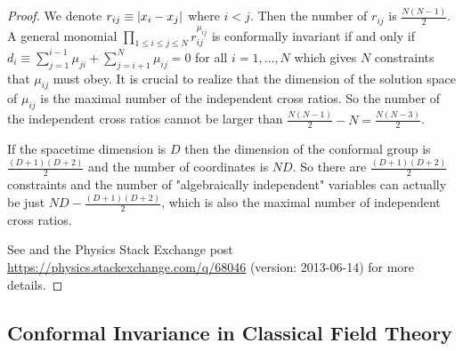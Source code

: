 \documentclass[10pt]{article}
\begin{document}
\begin{proof}
    We denote $r_{ij}\equiv\abs{x_i-x_j}$ where $i<j$.
    Then the number of $r_{ij}$ is $\frac{N(N-1)}{2}$.
    A general monomial $\prod_{1\leq i\leq j\leq N}r^{\mu_{ij}}_{ij}$ is conformally invariant if and only if $d_i\equiv\sum^{i-1}_{j=1}\mu_{ji}+\sum^N_{j=i+1}\mu_{ij}=0$ for all $i=1,\dots,N$ which gives $N$ constraints that $\mu_{ij}$ must obey.
    It is crucial to realize that the dimension of the solution space of $\mu_{ij}$ is the maximal number of the independent cross ratios\snm.
    So the number of the independent cross ratios cannot be larger than $\frac{N(N-1)}{2}-N=\frac{N(N-3)}{2}$.
    
    If the spacetime dimension is $D$ then the dimension of the conformal group is $\frac{(D+1)(D+2)}{2}$ and the number of coordinates is $ND$.
    So there are $\frac{(D+1)(D+2)}{2}$ constraints and the number of "algebraically independent" variables can actually be just $ND-\frac{(D+1)(D+2)}{2}$, which is also the maximal number of independent cross ratios.
    
    See \cite{Ginsparg:1988ui} and the Physics Stack Exchange post \url{https://physics.stackexchange.com/q/68046} (version: 2013-06-14) for more details.
\end{proof}

\subsection{Conformal Invariance in Classical Field Theory}
\end{document}
